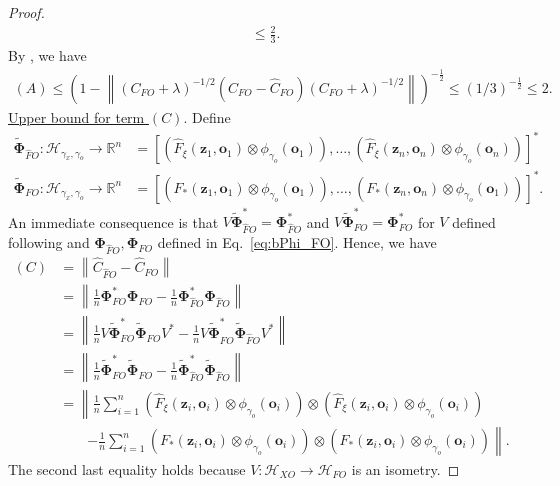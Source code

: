 \documentclass[11pt]{article}
\newcommand{\bz}{\mathbf z}
\newcommand{\bo}{\mathbf o}
\newcommand{\calH}{\mathcal{H}}
\newcommand{\R}{\mathbb{R}}
\newcommand{\0}{\mathbf{0}}
\newcommand{\bPhi}{\boldsymbol{\Phi}}
\begin{document}
\begin{appendix}
\begin{proof}
\begin{align*}
    &\leq \frac{2}{3}.
\end{align*}
By \citet[Proposition 7]{rudi2015less}, we have
\begin{align*}
    (A) \leq \left(1 - \left\|\left(C_{FO} +\lambda\right)^{-1 / 2}\left(C_{FO} -\hat{C}_{FO}\right) \left(C_{FO}+\lambda\right)^{-1 / 2} \right\|\right)^{-\frac{1}{2}} \leq (1/3)^{-\frac{1}{2}} \leq 2.
\end{align*}
\underline{Upper bound for term $(C)$}. Define
\begin{align*}
    \tilde{\bPhi}_{\hat{F}O} : \calH_{\gamma_x,\gamma_o} \to \R^{n} &= \left[ \left( \hat{F}_\xi(\bz_1, \bo_1) \otimes \phi_{\gamma_o}(\bo_1) \right) ,\dots, \left( \hat{F}_\xi(\bz_n, \bo_n) \otimes \phi_{\gamma_o}(\bo_n) \right) \right]^{\ast}\\
    \tilde{\bPhi}_{FO} : \calH_{\gamma_x,\gamma_o} \to \R^{n} &= \left[\left( F_{\ast}(\bz_1, \bo_1)\otimes \phi_{\gamma_o}(\bo_1) \right),\dots, \left( F_{\ast}(\bz_n, \bo_n) \otimes \phi_{\gamma_o}(\bo_1) \right) \right]^{\ast} .
\end{align*}
An immediate consequence is that $V \tilde{\bPhi}_{\hat{F}O}^\ast = \bPhi_{\hat{F}O}^\ast$ and $V \tilde{\bPhi}_{FO}^\ast = \bPhi_{FO}^\ast$ for $V$ defined following  and $\bPhi_{\hat{F}O}, \bPhi_{FO}$ defined in Eq.~\eqref{eq:bPhi_FO}.
Hence, we have
\begin{align*}
    (C) &= \left\|\hat{C}_{\hat{F}O}-\hat{C}_{FO}\right\| \\
    &= \left\| \frac{1}{n} \bPhi_{F O}^{\ast} \bPhi_{F O} - \frac{1}{n} \bPhi_{\hat{F} O}^\ast \bPhi_{\hat{F} O} \right\| \\
    &= \left\| \frac{1}{n} V \tilde{\bPhi}_{F O}^{\ast} \tilde{\bPhi}_{F O} V^\ast - \frac{1}{n} V \tilde{\bPhi}_{\hat{F} O}^\ast \tilde{\bPhi}_{\hat{F} O} V^\ast \right\| \\
    &= \left\| \frac{1}{n} \tilde{\bPhi}_{F O}^{\ast} \tilde{\bPhi}_{F O} - \frac{1}{n} \tilde{\bPhi}_{\hat{F} O}^\ast \tilde{\bPhi}_{\hat{F} O} \right\|\\ 
    &= \left\|\frac{1}{n}\sum_{i=1}^{n}\left(\hat{F}_\xi(\bz_i,\bo_i)\otimes \phi_{\gamma_o}(\bo_i)\right) \otimes \left(\hat{F}_\xi(\bz_i,\bo_i)\otimes \phi_{\gamma_o}(\bo_i)\right) \right. \\
    &\quad\quad \left. - \frac{1}{n}\sum_{i=1}^{n} \left(F_{\ast}(\bz_i,\bo_i)\otimes\phi_{\gamma_o}(\bo_i)\right)\otimes \left(F_{\ast}(\bz_i,\bo_i)\otimes\phi_{\gamma_o}(\bo_i)\right) \right\|.
\end{align*}
The second last equality holds because $V:\calH_{XO} \to \calH_{FO}$ is an isometry. 

\end{proof}
\end{appendix}
\end{document}
